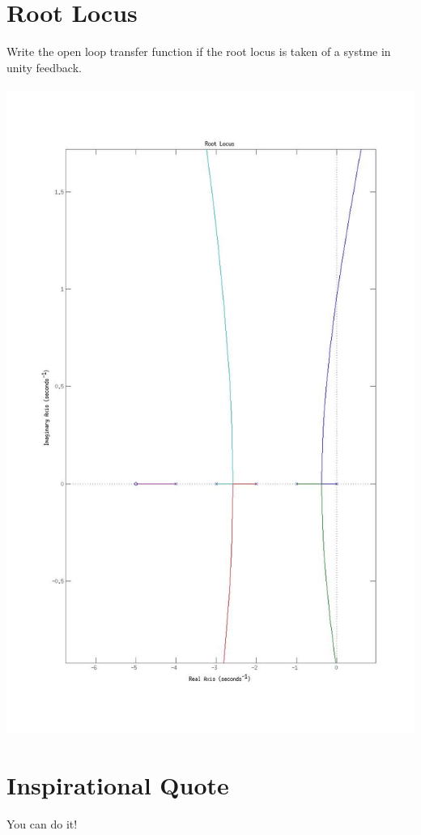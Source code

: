 \documentclass[10pt,a4paper]{article}
\begin{document}
\section*{Root Locus}
Write the open loop transfer function if the root locus is taken of a systme in unity feedback. 
\\ \\
\includegraphics[scale=0.4]{rootlocus.jpg}
\section*{Inspirational Quote}
You can do it!
\end{document}
